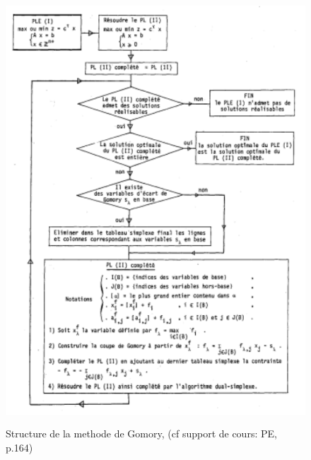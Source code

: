 \documentclass[a4paper,11pt,oneside]{report}
\theoremstyle{plain}
\newcommand{\0}{/ \! \! \! 0}
\theoremstyle{plain}
\begin{document}
 \begin{figure}[htbp]
  \begin{center}
  \includegraphics[height=16cm,width=14cm]{gomory.pdf}
  \caption{\label{gomory} Structure de la methode de Gomory, (cf support de cours: PE, p.164) }
  \end{center}
\end{figure}
\end{document}
